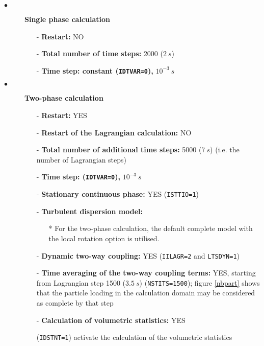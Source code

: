 \begin{description}

   \item[$\bullet$]\textbf{Single phase calculation}
         \begin{itemize}
            \item[-] {\bf Restart:} NO
            \item[-] {\bf Total number of time steps:} 2000 ($2~s$)
            \item[-] {\bf Time step: constant (\texttt{IDTVAR=0}), } $10^{-3}~s$
         \end{itemize}


   \item[$\bullet$]\textbf{Two-phase calculation}
         \begin{itemize}
            \item[-] {\bf Restart:} YES
            \item[-] {\bf Restart of the Lagrangian calculation:} NO
            \item[-] {\bf Total number of additional time steps:} 5000 ($7~s$)
                  (i.e. the number of Lagrangian steps)
            \item[-] {\bf Time step: (\texttt{IDTVAR=0}),} $10^{-3}~s$
            \item[-] \textbf{Stationary continuous phase:} YES (\texttt{ISTTIO=1})

            \item[-] {\bf Turbulent dispersion model:}
                  \begin{itemize}
                     \item[*] For the two-phase calculation, the default complete model with the local rotation option is utilised.

                  \end{itemize}
            \item[-] {\bf Dynamic two-way coupling:} YES (\texttt{IILAGR=2} and \texttt{LTSDYN=1})
            \item[-] {\bf Time averaging of the two-way coupling terms:} YES, starting from Lagrangian step 1500 ($3.5~s$) (\texttt{NSTITS=1500}); figure
                  \ref{nbpart} shows that the particle loading in the calculation domain may be considered as complete by that step
            \item[-] {\bf Calculation of volumetric statistics:} YES

                  (\texttt{IDSTNT=1}) activate the calculation of the volumetric statistics


\end{itemize}
\end{description}
